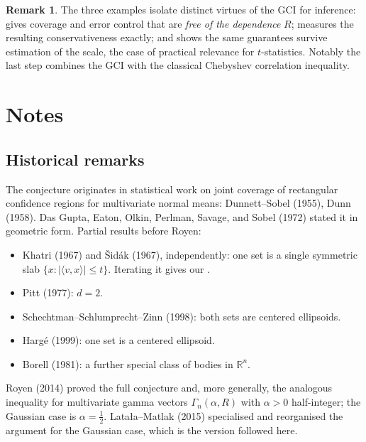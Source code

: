 \documentclass[12pt,a4paper]{article}
\theoremstyle{definition}
\newtheorem{remark}[theorem]{Remark}
\newcommand{\R}{\mathbb{R}}
\begin{document}
\begin{remark}
  The three examples isolate distinct virtues of the GCI for inference:
   gives coverage and error control that are
  \emph{free of the dependence} $R$;  measures the
  resulting conservativeness exactly; and  shows the same
  guarantees survive estimation of the scale, the case of practical
  relevance for $t$-statistics.  Notably the last step combines the GCI
  with the classical Chebyshev correlation inequality.
\end{remark}


\section{Notes}\label{sec:notes}

\subsection{Historical remarks}\label{note:history}

The conjecture originates in statistical work on joint coverage of
rectangular confidence regions for multivariate normal means:
Dunnett--Sobel (1955), Dunn (1958).  Das Gupta, Eaton, Olkin,
Perlman, Savage, and Sobel (1972) stated it in geometric form.
Partial results before Royen:
\begin{itemize}[nosep]
  \item Khatri (1967) and \v{S}id\'ak (1967), independently: one set
    is a single symmetric slab $\{x:|\langle v,x\rangle|\leqslant t\}$.
    Iterating it gives our .
  \item Pitt (1977): $d=2$.
  \item Schechtman--Schlumprecht--Zinn (1998): both sets are
    centered ellipsoids.
  \item Harg\'e (1999): one set is a centered ellipsoid.
  \item Borell (1981): a further special class of bodies in $\R^n$.
\end{itemize}
Royen (2014) proved the full conjecture and, more generally, the
analogous inequality for multivariate gamma vectors
$\Gamma_n(\alpha,R)$ with $\alpha>0$ half-integer; the Gaussian case
is $\alpha=\tfrac{1}{2}$.  Lata{\l}a--Matlak (2015) specialised and
reorganised the argument for the Gaussian case, which is the version
followed here.
\end{document}
